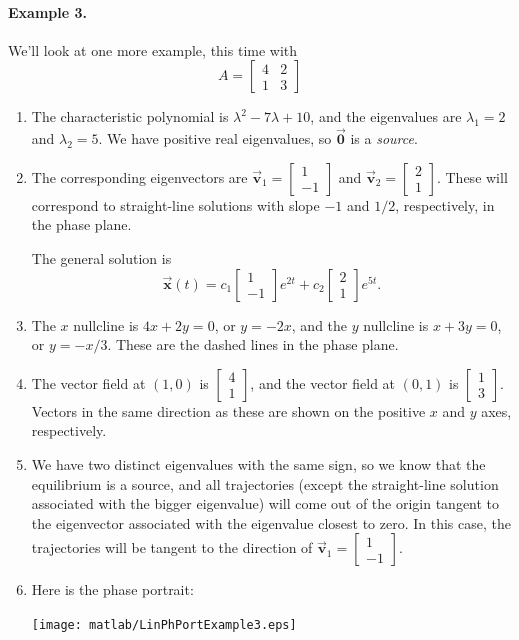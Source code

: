 \documentclass[reqno]{immbook}
\newcommand{\BV}{\vec{\textbf{v}}}
\newcommand{\BX}{\vec{\textbf{x}}}
\newcommand{\BZ}{\vec{\textbf{0}}}  %
\begin{document}
\paragraph{Example 3.}
We'll look at one more example, this time with
\[
   A = \begin{bmatrix}
            4 & 2 \\ 1 & 3
       \end{bmatrix}
\]
\begin{enumerate}
\item
The characteristic polynomial is
$\lambda^2 -7\lambda +10$, and the eigenvalues are
$\lambda_1 = 2$ and $\lambda_2 = 5$.
We have positive real eigenvalues, so
$\BZ$ is a \emph{source}.
\item
The corresponding eigenvectors are
$\BV_1 = \begin{bmatrix} 1 \\ -1 \end{bmatrix}$
and
$\BV_2 = \begin{bmatrix} 2 \\ 1 \end{bmatrix}$.
These will correspond to straight-line solutions with
slope $-1$ and $1/2$, respectively, in the phase plane.

The general solution is
\begin{equation}
\BX(t) = c_1 \begin{bmatrix} 1 \\ -1 \end{bmatrix} e^{2t}
   + c_2 \begin{bmatrix} 2 \\ 1 \end{bmatrix} e^{5t}.
\end{equation}
\item
The $x$ nullcline is $4x+2y=0$, or $y = -2x$, and the
$y$ nullcline is $x+3y=0$, or $y=-x/3$.  These are the
dashed lines in the phase plane.
\item
The vector field at $(1,0)$ is $\begin{bmatrix} 4 \\ 1 \end{bmatrix}$,
and the vector field at $(0,1)$
is $\begin{bmatrix} 1 \\ 3 \end{bmatrix}$.  Vectors in the
same direction as these are shown on the positive $x$ and $y$ axes,
respectively.
\item We have two distinct eigenvalues with the same sign, so
we know that the equilibrium is a source, and all trajectories
(except the straight-line solution associated with the
bigger eigenvalue) will come out of the origin
tangent to the eigenvector associated with the eigenvalue
closest to zero.  In this case, the trajectories will
be tangent to the direction of
$\BV_1 = \begin{bmatrix}1 \\ -1 \end{bmatrix}$.
\item
Here is the phase portrait:

\noindent
\centerline{\texttt{[image: matlab/LinPhPortExample3.eps]}}
\end{enumerate}
%
%
%
\end{document}
